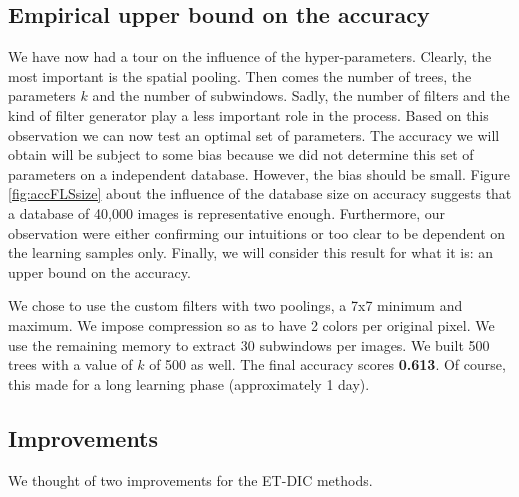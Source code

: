 \documentclass[a4paper]{report}
\begin{document}
	\subsection{\label{subsec:UpperBound}Empirical upper bound on the accuracy}
	We have now had a tour on the influence of the hyper-parameters. Clearly, the most important is the spatial pooling. Then comes the number of trees, the parameters $k$ and the number of subwindows. Sadly, the number of filters and the kind of filter generator play a less important role in the process.
	Based on this observation we can now test an optimal set of parameters. The accuracy we will obtain will be subject to some bias because we did not determine this set of parameters on a independent database. However, the bias should be small. Figure \ref{fig:accFLSsize} about the influence of the database size on accuracy suggests that a database of 40,000 images is representative enough. Furthermore, our observation were either confirming our intuitions or too clear to be dependent on the learning samples only. Finally, we will consider this result for what it is: an upper bound on the accuracy.
	\par
	We chose to use the custom filters with two poolings, a 7x7 minimum and maximum. We impose compression so as to have 2 colors per original pixel. We use the remaining memory to extract 30 subwindows per images. We built 500 trees with a value of $k$ of 500 as well. The final accuracy scores \textbf{0.613}. Of course, this made for a long learning phase (approximately 1 day).
	
	\subsection{Improvements}
	We thought of two improvements for the ET-DIC methods. 
	
\end{document}
